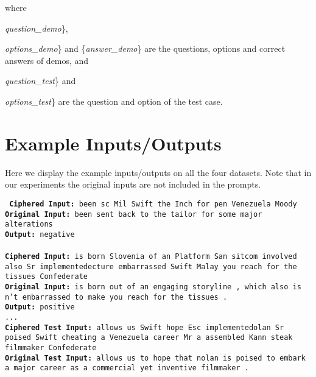 \documentclass[11pt]{article}
\newcommand{\daniel}[1]{{\color{purple}[{\bf DK}: #1]}}
\newcommand{\qwen}{QWen 2.5 }
\begin{document}
\noindent where {\textit{question\_demo}\}, {\textit{options\_demo}\} and \{\textit{answer\_demo}\} are the questions, options and correct answers of demos, and {\textit{question\_test}\} and {\textit{options\_test}\} are the question and option of the test case.



\section{Example Inputs/Outputs}
\label{appendix:examples}
Here we display the example inputs/outputs on all the four datasets. Note that in our experiments the original inputs are not included in the prompts.
\begin{tcolorbox}[colback=gray!5!white,colframe=gray!75!black,title=\textbf{
Dataset: SST-2; Model: \qwen; Cipher: bijective; Shuffle Rate: 0.6
}]
{
\tt
\textbf{Ciphered Input:} been sc Mil Swift the Inch for pen Venezuela Moody  \\
\textbf{Original Input:} been sent back to the tailor for some major alterations\\
\textbf{Output:} negative\\
 \\
\textbf{Ciphered Input:} is born Slovenia of an Platform San sitcom involved also Sr implementedecture embarrassed Swift Malay you reach for the tissues Confederate  \\
\textbf{Original Input:} is born out of an engaging storyline , which also is n't embarrassed to make you reach for the tissues . \\
\textbf{Output:} positive \\
... \\

\textbf{Ciphered Test Input:} allows us Swift hope Esc implementedolan Sr poised Swift cheating a Venezuela career Mr a assembled Kann steak filmmaker Confederate   \\
\textbf{Original Test Input:} allows us to hope that nolan is poised to embark a major career as a commercial yet inventive filmmaker . \\
}
\end{tcolorbox}

}}}}
\end{document}
